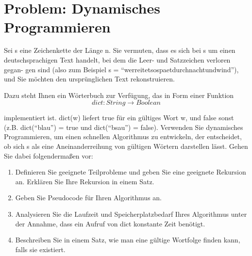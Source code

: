 \section{Problem: Dynamisches Programmieren}

Sei s eine Zeichenkette der Länge n. Sie vermuten, dass es sich bei s um einen
deutschsprachigen Text handelt, bei dem die Leer- und Satzzeichen verloren gegan-
gen sind (also zum Beispiel s = “werreitetsospaetdurchnachtundwind”), und Sie
möchten den ursprünglichen Text rekonstruieren.

\vspace{1em}

\noindent
Dazu steht Ihnen ein Wörterbuch zur Verfügung, das in Form einer Funktion
$$dict : String \rightarrow Boolean$$

\noindent
implementiert ist. dict(w) liefert true für ein gültiges Wort w, und false sonst
(z.B. dict(“blau”) = true und dict(“bsau”) = false).
Verwenden Sie dynamisches Programmieren, um einen schnellen Algorithmus zu
entwickeln, der entscheidet, ob sich s als eine Aneinanderreihung von gültigen
Wörtern darstellen lässt. Gehen Sie dabei folgendermaßen vor:

\begin{enumerate}
	\item Definieren Sie geeignete Teilprobleme und geben Sie eine geeignete Rekursion an. Erklären Sie Ihre Rekursion in einem Satz.
	\item Geben Sie Pseudocode für Ihren Algorithmus an.
	\item Analysieren Sie die Laufzeit und Speicherplatzbedarf Ihres Algorithmus unter der Annahme, dass ein Aufruf von dict konstante Zeit benötigt.
	\item Beschreiben Sie in einem Satz, wie man eine gültige Wortfolge finden kann,
	falls sie existiert.
\end{enumerate}